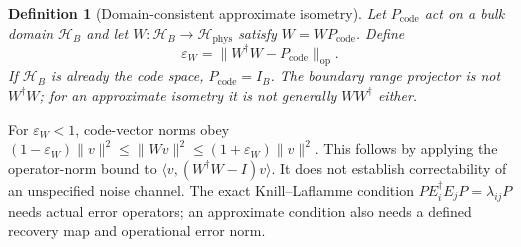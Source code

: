 \documentclass[11pt,a4paper]{article}
\newtheorem{definition}[theorem]{Definition}
\newcommand{\op}{\mathrm{op}}
\newcommand{\code}{\mathrm{code}}
\newcommand{\Hil}{\mathcal H}
\begin{document}
\begin{definition}[Domain-consistent approximate isometry]
Let $P_\code$ act on a bulk domain $\Hil_B$ and let $W:\Hil_B\to\Hil_{\mathrm{phys}}$
satisfy $W=WP_\code$. Define
\[
 \varepsilon_W=\|W^\dagger W-P_\code\|_\op.
\]
If $\Hil_B$ is already the code space, $P_\code=I_B$. The boundary range projector is
not $W^\dagger W$; for an approximate isometry it is not generally $WW^\dagger$ either.
\end{definition}
For $\varepsilon_W<1$, code-vector norms obey
$(1-\varepsilon_W)\|v\|^2\le\|Wv\|^2\le(1+\varepsilon_W)\|v\|^2$.
This follows by applying the operator-norm bound to $\langle v,(W^\dagger W-I)v\rangle$.
It does not establish correctability of an unspecified noise channel. The exact
Knill--Laflamme condition $P E_i^\dagger E_jP=\lambda_{ij}P$ needs actual error operators;
an approximate condition also needs a defined recovery map and operational error norm.
\end{document}
